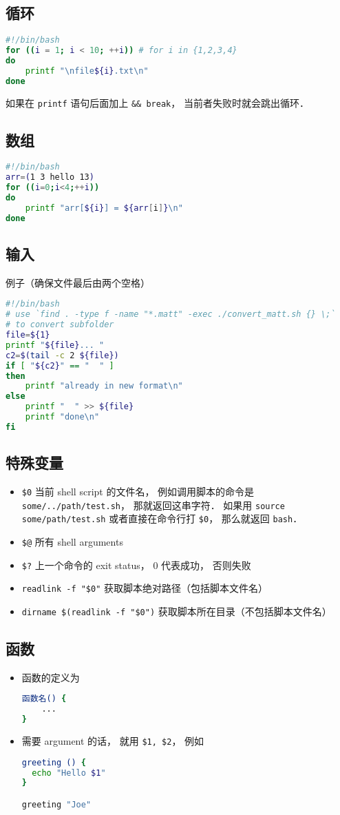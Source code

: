 \subsection{循环}
\begin{lstlisting}[language=bash]
#!/bin/bash
for ((i = 1; i < 10; ++i)) # for i in {1,2,3,4}
do
	printf "\nfile${i}.txt\n"
done
\end{lstlisting}
如果在 \verb|printf| 语句后面加上 \verb|&& break|， 当前者失败时就会跳出循环．

\subsection{数组}
\begin{lstlisting}[language=bash]
#!/bin/bash
arr=(1 3 hello 13)
for ((i=0;i<4;++i))
do
    printf "arr[${i}] = ${arr[i]}\n"
done
\end{lstlisting}


\subsection{输入}
例子（确保文件最后由两个空格）

\begin{lstlisting}[language=bash]
#!/bin/bash
# use `find . -type f -name "*.matt" -exec ./convert_matt.sh {} \;`
# to convert subfolder
file=${1}
printf "${file}... "
c2=$(tail -c 2 ${file})
if [ "${c2}" == "  " ]
then
	printf "already in new format\n"
else
	printf "  " >> ${file}
	printf "done\n"
fi
\end{lstlisting}

\subsection{特殊变量}
\begin{itemize}
\item \verb`$0` 当前 shell script 的文件名， 例如调用脚本的命令是 \verb|some/../path/test.sh|， 那就返回这串字符． 如果用 \verb|source some/path/test.sh| 或者直接在命令行打 \verb|$0|， 那么就返回 \verb|bash|．
\item \verb`$@` 所有 shell arguments
\item \verb|$?| 上一个命令的 exit status， 0 代表成功， 否则失败
\item \verb|readlink -f "$0"| 获取脚本绝对路径（包括脚本文件名）
\item \verb|dirname $(readlink -f "$0")| 获取脚本所在目录（不包括脚本文件名）
\end{itemize}

\subsection{函数}

\begin{itemize}
\item 函数的定义为
\begin{lstlisting}[language=bash]
函数名() {
	...
}
\end{lstlisting}
\item 需要 argument 的话， 就用 \verb|$1, $2|， 例如
\begin{lstlisting}[language=bash]
greeting () {
  echo "Hello $1"
}

greeting "Joe"
\end{lstlisting}
\end{itemize}
